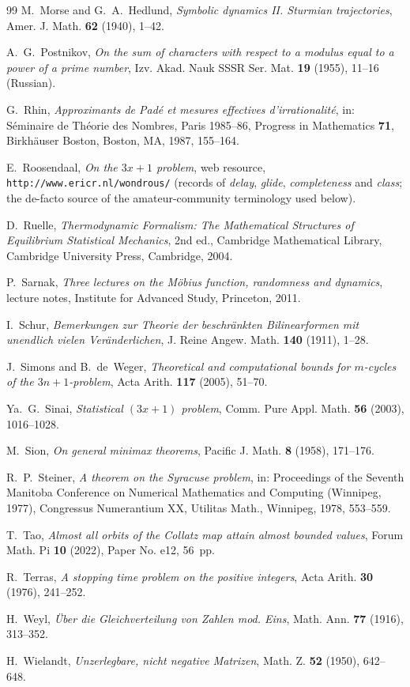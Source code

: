 \documentclass[11pt]{article}
\theoremstyle{plain}
\theoremstyle{definition}
\theoremstyle{remark}
\begin{document}
\begin{thebibliography}{99}
 M.~Morse and G.~A.~Hedlund, \emph{Symbolic dynamics
II. Sturmian trajectories}, Amer. J. Math. \textbf{62} (1940), 1--42.

 A.~G.~Postnikov, \emph{On the sum of characters with
respect to a modulus equal to a power of a prime number}, Izv. Akad. Nauk SSSR
Ser. Mat. \textbf{19} (1955), 11--16 (Russian).

 G.~Rhin, \emph{Approximants de Pad\'e et mesures effectives
d'irrationalit\'e}, in: S\'eminaire de Th\'eorie des Nombres, Paris 1985--86,
Progress in Mathematics \textbf{71}, Birkh\"auser Boston, Boston, MA, 1987,
155--164.

 E.~Roosendaal, \emph{On the $3x+1$ problem},
web resource, \texttt{http://www.ericr.nl/wondrous/} (records of
\emph{delay}, \emph{glide}, \emph{completeness} and \emph{class}; the
de-facto source of the amateur-community terminology used below).

 D.~Ruelle, \emph{Thermodynamic Formalism: The
Mathematical Structures of Equilibrium Statistical Mechanics}, 2nd ed.,
Cambridge Mathematical Library, Cambridge University Press, Cambridge, 2004.

 P.~Sarnak, \emph{Three lectures on the M\"obius function,
randomness and dynamics}, lecture notes, Institute for Advanced Study,
Princeton, 2011.

 I.~Schur, \emph{Bemerkungen zur Theorie der
beschr\"ankten Bilinearformen mit unendlich vielen Ver\"anderlichen}, J. Reine
Angew. Math. \textbf{140} (1911), 1--28.

 J.~Simons and B.~de~Weger, \emph{Theoretical and
computational bounds for $m$-cycles of the $3n+1$-problem}, Acta Arith.
\textbf{117} (2005), 51--70.

 Ya.~G.~Sinai, \emph{Statistical $(3x+1)$ problem}, Comm.
Pure Appl. Math. \textbf{56} (2003), 1016--1028.

 M.~Sion, \emph{On general minimax theorems}, Pacific J.
Math. \textbf{8} (1958), 171--176.

 R.~P.~Steiner, \emph{A theorem on the Syracuse problem},
in: Proceedings of the Seventh Manitoba Conference on Numerical Mathematics
and Computing (Winnipeg, 1977), Congressus Numerantium XX, Utilitas Math.,
Winnipeg, 1978, 553--559.

 T.~Tao, \emph{Almost all orbits of the Collatz map attain
almost bounded values}, Forum Math. Pi \textbf{10} (2022), Paper No. e12,
56~pp.

 R.~Terras, \emph{A stopping time problem on the positive
integers}, Acta Arith. \textbf{30} (1976), 241--252.

 H.~Weyl, \emph{\"Uber die Gleichverteilung von Zahlen mod.
Eins}, Math. Ann. \textbf{77} (1916), 313--352.

 H.~Wielandt, \emph{Unzerlegbare, nicht negative
Matrizen}, Math. Z. \textbf{52} (1950), 642--648.

\end{thebibliography}
\end{document}
